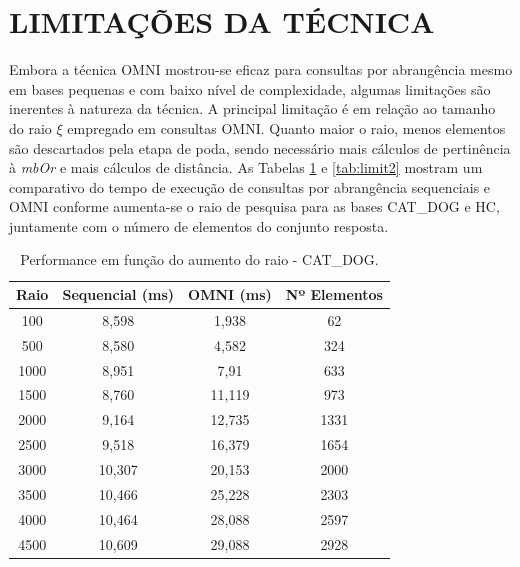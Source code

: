 \section{LIMITAÇÕES DA TÉCNICA}
\label{sec:limit}
Embora a técnica OMNI mostrou-se eficaz para consultas por abrangência mesmo em bases pequenas e com baixo nível de complexidade,
algumas limitações são inerentes à natureza da técnica. A principal limitação é em relação ao tamanho do raio $\xi$ empregado em consultas OMNI.
Quanto maior o raio, menos elementos são descartados pela etapa de poda, sendo necessário mais cálculos de pertinência à \textit{mbOr} e mais cálculos
de distância. As Tabelas \ref{tab:limit1} e \ref{tab:limit2} mostram um comparativo do tempo de execução de consultas por abrangência sequenciais e OMNI conforme aumenta-se
o raio de pesquisa para as bases CAT\_DOG e HC, juntamente com o número de elementos do conjunto resposta.

\begin{table}[H]
    \centering
    \caption[Performance em função do aumento do raio - CAT\_DOG]{Performance em função do aumento do raio - CAT\_DOG.
    \label{tab:limit1}}
   \begin{tabular}{c c c c}
        \toprule
           Raio &Sequencial (ms)&OMNI (ms) &Nº Elementos\\
        \midrule
            100 & 8,598 & 1,938 & 62 \\
            500 & 8,580 & 4,582 & 324 \\
            1000 & 8,951 & 7,91 & 633 \\
            1500 & 8,760 & 11,119 & 973 \\
            2000 & 9,164 & 12,735 & 1331 \\
            2500 & 9,518 & 16,379 & 1654 \\
            3000 & 10,307 & 20,153 & 2000 \\
            3500 & 10,466 & 25,228 & 2303 \\
            4000 & 10,464 & 28,088 & 2597 \\
            4500 & 10,609 & 29,088 & 2928 \\
           
        \bottomrule
    \end{tabular}
\end{table}

